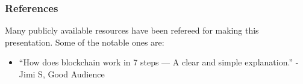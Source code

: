 \begin{frame}\frametitle{References}
Many publicly available resources have been refereed for making this presentation. Some of the notable ones are:
\small
\begin{itemize}
\item ``How does blockchain work in 7 steps — A clear and simple explanation.'' - Jimi S, Good Audience
\end{itemize}
\end{frame}
